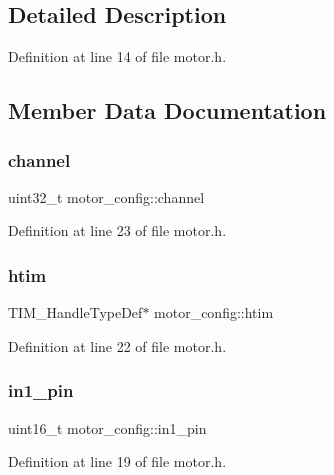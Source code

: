 \subsection{Detailed Description}


Definition at line 14 of file motor.\+h.



\subsection{Member Data Documentation}
\mbox{\label{structmotor__config_a59eeef5fc4909b5bdcc5f98cfd16378a}} 
\subsubsection{\texorpdfstring{channel}{channel}}
{\footnotesize\ttfamily uint32\+\_\+t motor\+\_\+config\+::channel}



Definition at line 23 of file motor.\+h.

\mbox{\label{structmotor__config_a9926810d168ac02bb71d8da15fbcd10d}} 
\subsubsection{\texorpdfstring{htim}{htim}}
{\footnotesize\ttfamily T\+I\+M\+\_\+\+Handle\+Type\+Def$\ast$ motor\+\_\+config\+::htim}



Definition at line 22 of file motor.\+h.

\mbox{\label{structmotor__config_ab96ecf85a5bee0e13f1be1ac799ee24b}} 
\subsubsection{\texorpdfstring{in1\_pin}{in1\_pin}}
{\footnotesize\ttfamily uint16\+\_\+t motor\+\_\+config\+::in1\+\_\+pin}



Definition at line 19 of file motor.\+h.

